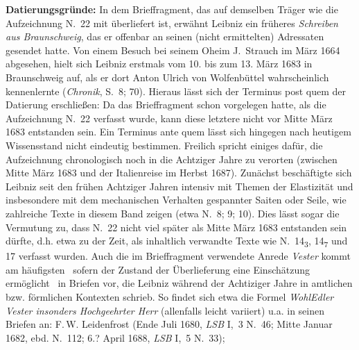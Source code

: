 \begin{ledgroup}
\footnotesize
\pstart
\noindent\textbf{Datierungsgründe:}
In dem Brieffragment, das auf demselben Träger wie die Aufzeichnung N.~22 mit überliefert ist, erwähnt Leibniz ein früheres \textit{Schreiben aus Braunschweig}, das er offenbar an seinen (nicht ermittelten) Adressaten gesendet hatte.
Von einem Besuch bei seinem Oheim J.~Strauch\protect{} im März 1664 abgesehen, hielt sich Leibniz erstmals vom 10. bis zum 13. März 1683 in Braunschweig auf, als er dort Anton Ulrich von Wolfenbüttel\protect{} wahrscheinlich kennenlernte (\textit{Chronik}, S.~8; 70\cite{01236}).
Hieraus lässt sich der Terminus post quem der Datierung erschließen:
Da das Brieffragment schon vorgelegen hatte, als die Aufzeichnung N.~22 verfasst wurde, kann diese letztere nicht vor Mitte März 1683 entstanden sein.
\pend%
\pstart%
Ein Terminus ante quem lässt sich hingegen nach heutigem Wissensstand nicht eindeutig bestimmen.
Freilich spricht einiges dafür, die Aufzeichnung chronologisch noch in die Achtziger Jahre zu verorten (zwischen Mitte März 1683 und der Italienreise im Herbst 1687).
Zunächst beschäftigte sich Leibniz seit den frühen Achtziger Jahren intensiv mit Themen der Elastizität und insbesondere mit dem mechanischen Verhalten gespannter Saiten oder Seile, wie zahlreiche Texte in diesem Band zeigen (etwa N.~8; 9; 10).
Dies lässt sogar die Vermutung zu, dass N.~22 nicht viel später als Mitte März 1683 entstanden sein dürfte, d.h. etwa zu der Zeit, als inhaltlich verwandte Texte wie N.~14\textsubscript{3}, 14\textsubscript{7} und 17 verfasst wurden.
Auch die im Brieffragment verwendete Anrede \textit{Vester} kommt am häufigsten \textendash\ sofern der Zustand der Überlieferung eine Einschätzung ermöglicht \textendash\ in Briefen vor, die Leibniz während der Achtiziger Jahre in amtlichen bzw. förmlichen Kontexten schrieb.
So findet sich etwa die Formel \textit{Wohl\-Edler Vester insonders Hochgeehrter Herr} (allenfalls leicht variiert) u.a. in seinen Briefen an:
F.\,W. Leidenfrost
(Ende Juli 1680, \textit{LSB} I,~3 N.~46;\cite{01325}
Mitte Januar 1682, ebd. N.~112;\cite{01326}
6.? April 1688, \textit{LSB} I,~5 N.~33);\cite{01327}%
\protect{}

\end{ledgroup}

